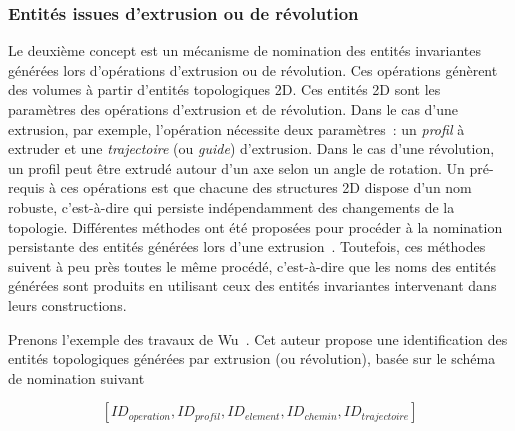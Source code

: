 


\subsubsection*{Entités issues d'extrusion ou de révolution}


Le deuxième concept est un mécanisme de nomination des entités invariantes
générées lors d'opérations d'extrusion ou de révolution. %
Ces opérations génèrent des volumes à partir d'entités topologiques 2D. %
Ces entités 2D sont les paramètres des opérations d'extrusion et de
révolution. %
Dans le cas d'une extrusion, par exemple, l'opération nécessite deux paramètres~:  un \emph{profil} à extruder et une \emph{trajectoire} (ou \emph{guide})
d'extrusion. %
Dans le cas d'une révolution, un profil peut être extrudé autour d'un axe selon
un angle de rotation. %
Un pré-requis à ces opérations est que chacune des structures 2D dispose d'un
nom robuste, c'est-à-dire qui persiste indépendamment des changements de la
topologie. %
Différentes méthodes ont été proposées pour procéder à la nomination persistante
des entités générées lors d'une
extrusion~\cite{chen1995representation,wu2001face,agbodan2003topological}. %
Toutefois, ces méthodes suivent à peu près toutes le même procédé, c'est-à-dire
que les noms des entités générées sont produits en utilisant ceux des entités
invariantes intervenant dans leurs constructions. %


Prenons l'exemple des travaux de Wu~\cite{wu2001face}. %
Cet auteur propose une identification des entités topologiques générées par extrusion (ou
révolution), basée sur le schéma de nomination suivant

\[[ID_{operation},ID_{profil},ID_{element},ID_{chemin},ID_{trajectoire}]\]


